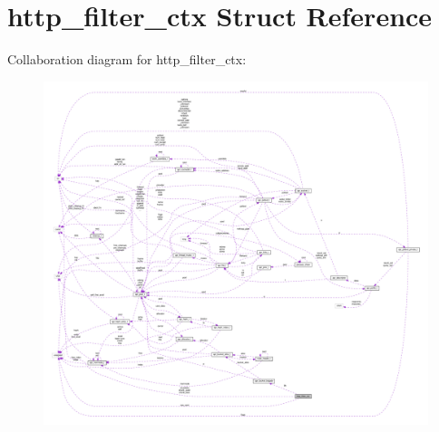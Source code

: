 \hypertarget{structhttp__filter__ctx}{}\section{http\+\_\+filter\+\_\+ctx Struct Reference}
\label{structhttp__filter__ctx}


Collaboration diagram for http\+\_\+filter\+\_\+ctx\+:
\nopagebreak
\begin{figure}[H]
\begin{center}
\leavevmode
\includegraphics[width=350pt]{structhttp__filter__ctx__coll__graph}
\end{center}
\end{figure}
